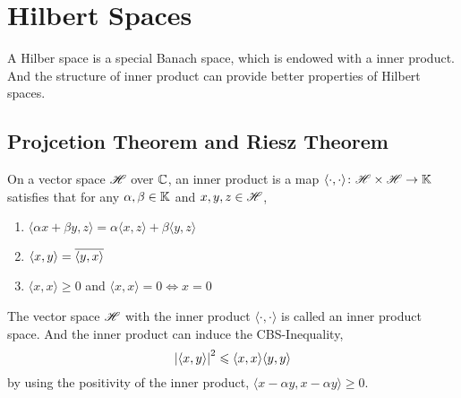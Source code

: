\documentclass[a4paper,11pt]{report}
\begin{document}

\section{Hilbert Spaces}

A Hilber space is a special Banach space, which is endowed with a inner product. And the structure of inner product can provide better properties of Hilbert spaces.

\subsection{Projcetion Theorem and Riesz Theorem}

\begin{defn}
	On a vector space $\mathscr{H}$ over $\mathbb{C}$, an inner product is a map $ \langle \cdot, \cdot \rangle \colon \mathscr{H} \times \mathscr{H} \rightarrow \mathbb{K}$ satisfies that for any $\alpha, \beta \in \mathbb{K}$ and $x,y,z \in \mathscr{H}$,
	\begin{enumerate}[label=\arabic*)]
	 	\item $ \langle \alpha x + \beta y,z \rangle = \alpha  \langle x,z \rangle + \beta  \langle y,z \rangle$
	 	\item $ \langle x,y \rangle = \overline{ \langle y,x \rangle}$
	 	\item $ \langle x,x \rangle \geqslant 0$ and $ \langle x,x \rangle = 0 \Leftrightarrow x = 0$
	\end{enumerate} 
\end{defn}
\begin{rem}
	The vector space $\mathscr{H}$ with the inner product $ \langle \cdot,\cdot \rangle$ is called an inner product space. And the inner product can induce the CBS-Inequality, 
	\begin{equation*}
		\left\lvert \langle x,y \rangle\right\lvert^{2} \leqslant  \langle x,x \rangle \langle y,y \rangle
	\end{equation*}
	by using the positivity of the inner product, $ \langle x-\alpha y,x-\alpha y \rangle \geqslant$0.
\end{rem}
\end{document}
